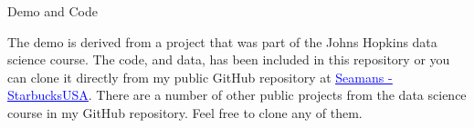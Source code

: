 \documentclass{beamer}
\begin{document}
\begin{frame}{
	\begin{minipage}[t]{0.75\textwidth}
		Demo and Code
	\end{minipage}
	\hfill
	\begin{minipage}[t]{0.25\textwidth}
		\flushright
	\end{minipage}
}{}
The demo is derived from a project that was part of the Johns Hopkins data science course. The code, and data, has been included in this repository or you can clone it directly from my public GitHub repository at \href{https://github.com/gseamans/starbucksUsa}{\textcolor{blue}{\underline{Seamans - StarbucksUSA}}}. There are a number of other public projects from the data science course in my GitHub repository. Feel free to clone any of them.

\end{frame}
\end{document}
